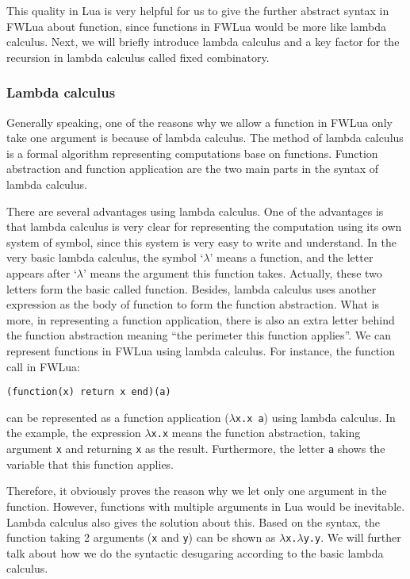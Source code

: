 \documentclass{article}
\begin{document}
This quality in Lua is very helpful for us to give the further abstract syntax in FWLua about function, since functions in FWLua would be more like lambda calculus. Next, we will briefly introduce lambda calculus and a key factor for the recursion in lambda calculus called fixed combinatory.

\subsubsection{Lambda calculus}
Generally speaking, one of the reasons why we allow a function in FWLua only take one argument is because of lambda calculus. The method of lambda calculus is a formal algorithm representing computations base on functions. Function abstraction and function application are the two main parts in the syntax of lambda calculus. 

There are several advantages using lambda calculus. One of the advantages is that lambda calculus is very clear for representing the computation using its own system of symbol, since this system is very easy to write and understand. In the very basic lambda calculus, the symbol `$\lambda$' means a function, and the letter appears after `$\lambda$' means the argument this function takes. Actually, these two letters form the basic called function. Besides, lambda calculus uses another expression as the body of function to form the function abstraction. What is more, in representing a function application, there is also an extra letter behind the function abstraction meaning ``the perimeter this function applies''. We can represent functions in FWLua using lambda calculus. For instance, the function call in FWLua:
\begin{flushleft}
\tt (function(x) return x end)(a)
\end{flushleft}
can be represented as a function application ({\tt $\lambda$x.x a}) using lambda calculus. In the example, the expression {\tt $\lambda$x.x} means the function abstraction, taking argument {\tt x} and returning {\tt x} as the result. Furthermore, the letter {\tt a} shows the variable that this function applies.

Therefore, it obviously proves the reason why we let only one argument in the function. However, functions with multiple arguments in Lua would be inevitable. Lambda calculus also gives the solution about this. Based on the syntax, the function taking 2 arguments ({\tt x} and {\tt y}) can be shown as {\tt $\lambda$x.$\lambda$y.y}. We will further talk about how we do the syntactic desugaring according to the basic lambda calculus.
\end{document}
